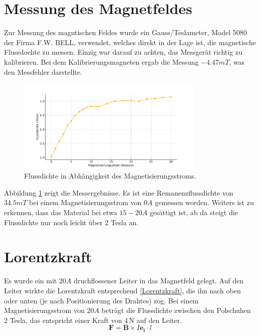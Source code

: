 \documentclass[a4paper,twoside,12pt,DIV=13,BCOR=5mm,numbers=noenddot,cleardoublepage=empty]{scrbook}
\begin{document}
\section{Messung des Magnetfeldes}
Zur Messung des magntischen Feldes wurde ein Gauss/Teslameter, Model 5080 der Firma F.W. BELL, verwendet, welches direkt in der Lage ist, die magnetische Flussdochte zu messen. Einzig war darauf zu achten, das Messgerät richtig zu kalibrieren. Bei dem Kalibrierungsmagneten ergab die Messung $-4.47 mT$, was den Messfehler darstellte.

\begin{figure}[H]
    \centering
    \includegraphics[width=0.8\textwidth]{pictures/Flussdichte_Strom_Plot_Updated.pdf}
    \caption{Flussdichte in Abhängigkeit des Magnetisierungsstroms.}
    \label{fig:flussdichtestrom}
\end{figure}

\noindent Abbildung \ref{fig:flussdichtestrom} zeigt die Messergebnisse. Es ist eine Remanenzflussdichte von $34.5 mT$ bei einem Magnetisierungsstrom von $0 A$ gemessen worden. Weiters ist zu erkennen, dass das Material bei etwa $15-20 A$ gesättigt ist, ab da steigt die Flussdichte nur noch leicht über 2 Tesla an.

\section{Lorentzkraft}
Es wurde ein mit $20 A$ druchflossener Leiter in das Magnetfeld gelegt. Auf den Leiter wirkte die Lorentzkraft entsprechend \autoref{Lorentzkraft}, die ihn nach oben oder unten (je nach Positionierung des Drahtes) zog. Bei einem Magnetisierungsstrom von $20 A$ beträgt die Flussdichte zwischen den Polschuhen 2 Tesla, das entspricht einer Kraft von 4\,N auf den Leiter.
\begin{equation}
	\mathbf{F} = \mathbf{B} \times I \mathbf{e_i} \cdot l
	\label{Lorentzkraft}
\end{equation}
\end{document}
